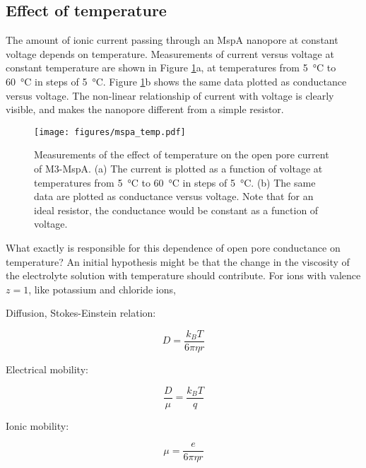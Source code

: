 \subsection{Effect of temperature}

The amount of ionic current passing through an MspA nanopore at constant voltage depends on temperature.  Measurements of current versus voltage at constant temperature are shown in Figure \ref{fig:mspa_current_temp}a, at temperatures from \SI{5}{\degreeCelsius} to \SI{60}{\degreeCelsius} in steps of \SI{5}{\degreeCelsius}.  Figure \ref{fig:mspa_current_temp}b shows the same data plotted as conductance versus voltage.  The non-linear relationship of current with voltage is clearly visible, and makes the nanopore different from a simple resistor.

\begin{figure}[h]
\begin{centering}
\texttt{[image: figures/mspa\_temp.pdf]}
\caption[MspA current versus temperature]{Measurements of the effect of temperature on the open pore current of M3-MspA.  (a) The current is plotted as a function of voltage at temperatures from \SI{5}{\degreeCelsius} to \SI{60}{\degreeCelsius} in steps of \SI{5}{\degreeCelsius}.  (b) The same data are plotted as conductance versus voltage.  Note that for an ideal resistor, the conductance would be constant as a function of voltage.}
\label{fig:mspa_current_temp}
\end{centering}
\end{figure}

What exactly is responsible for this dependence of open pore conductance on temperature?  An initial hypothesis might be that the change in the viscosity of the electrolyte solution with temperature should contribute.  For ions with valence $z=1$, like potassium and chloride ions,

Diffusion, Stokes-Einstein relation:

\begin{equation}
D = \frac{k_B T}{6\pi\eta r}
\label{eqn:conductivity}
\end{equation}

Electrical mobility:

\begin{equation}
\frac{D}{\mu} = \frac{k_B T}{q}
\label{eqn:einstein_mobility}
\end{equation}

Ionic mobility:

\begin{equation}
\mu = \frac{e}{6 \pi \eta r}
\label{eqn:mobility}
\end{equation}

